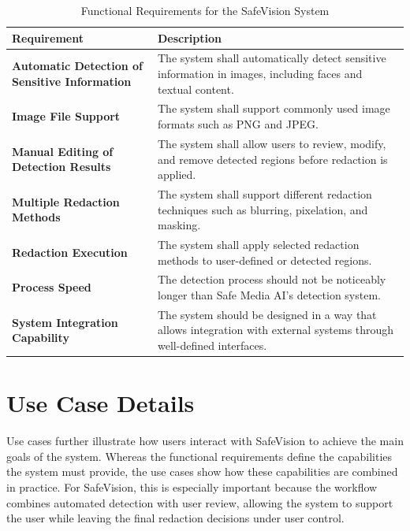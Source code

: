 \begin{table}[H]
\centering
\begin{tabular}{|p{5cm}|p{9cm}|}
\hline
\textbf{Requirement} & \textbf{Description} \\ \hline

\textbf{Automatic Detection of Sensitive Information} & 
The system shall automatically detect sensitive information in images, including faces and textual content. \\ \hline

\textbf{Image File Support} & 
The system shall support commonly used image formats such as PNG and JPEG. \\ \hline

\textbf{Manual Editing of Detection Results} & 
The system shall allow users to review, modify, and remove detected regions before redaction is applied. \\ \hline

\textbf{Multiple Redaction Methods} & 
The system shall support different redaction techniques such as blurring, pixelation, and \gls{masking}. \\ \hline

\textbf{Redaction Execution} & 
The system shall apply selected redaction methods to user-defined or detected regions. \\ \hline

\textbf{Process Speed} &
The detection process should not be noticeably longer than Safe Media AI's detection system. \\ \hline

\textbf{System Integration Capability} & 
The system should be designed in a way that allows integration with external systems through well-defined interfaces. \\ \hline

\end{tabular}
\caption{Functional Requirements for the \gls{SafeVision} System}
\label{tab:functional_requirements}
\end{table}


\section{Use Case Details}

Use cases further illustrate how users interact with \gls{SafeVision} to achieve the main goals of the system. Whereas the functional requirements define the capabilities the system must provide, the use cases show how these capabilities are combined in practice. For \gls{SafeVision}, this is especially important because the workflow combines automated detection with user review, allowing the system to support the user while leaving the final redaction decisions under user control.

